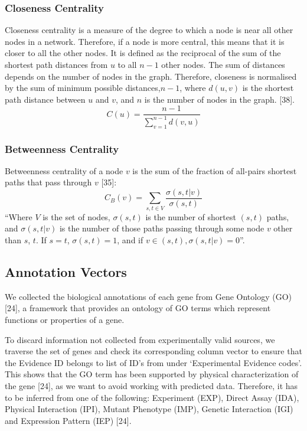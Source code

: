 \documentclass[9pt]{article}
\begin{document}
\subsubsection{Closeness Centrality} 
Closeness centrality is a measure of the degree to which a node is near all other nodes in a network. Therefore, if a node is more central, this means that it is closer to all the other nodes. It is defined as the reciprocal of the sum of the shortest path distances from \(u\) to all \(n-1\) other nodes. The sum of distances depends on the number of nodes in the graph. Therefore, closeness is normalised by the sum of minimum possible distances,\( n-1\), where \(d(u,v)\) is the shortest path distance between \(u\) and \(v\), and \(n\) is the number of nodes in the graph. [38].
\begin{equation}
C(u)=\frac{n-1}{\sum_{v=1}^{n-1} d(v,u)}
\end{equation}

\subsubsection{Betweenness Centrality}
Betweenness centrality of a node \(v\) is the sum of the fraction of all-pairs shortest paths that pass through \(v\) [35]:
\begin{equation}
C_B(v)=\sum_{s,t\in{V}}\frac{\sigma(s, t|v)}{\sigma(s, t)}
\end{equation}
“Where \(V\) is the set of nodes, \(\sigma(s, t)\) is the number of shortest \((s, t)\) paths, and \(\sigma(s, t|v)\) is the number of those paths passing through some node \(v\) other than \(s\), \(t\). If \(s = t\), \(\sigma(s, t) = 1\), and if \(v \in (s, t), \sigma(s, t|v) = 0\)”.

\subsection{Annotation Vectors}
We collected the biological annotations of each gene from Gene Ontology (GO) [24], a framework that provides an ontology of GO terms which represent functions or properties of a gene. 

To discard information not collected from experimentally valid sources, we traverse the set of genes and check its corresponding column vector to ensure that the Evidence ID belongs to list of ID’s from under ‘Experimental Evidence codes’. This shows that the GO term has been supported by physical characterization of the gene [24], as we want to avoid working with predicted data. Therefore, it has to be inferred from one of the following: Experiment (EXP), Direct Assay (IDA), Physical Interaction (IPI), Mutant Phenotype (IMP), Genetic Interaction (IGI) and Expression Pattern (IEP) [24].
\end{document}
